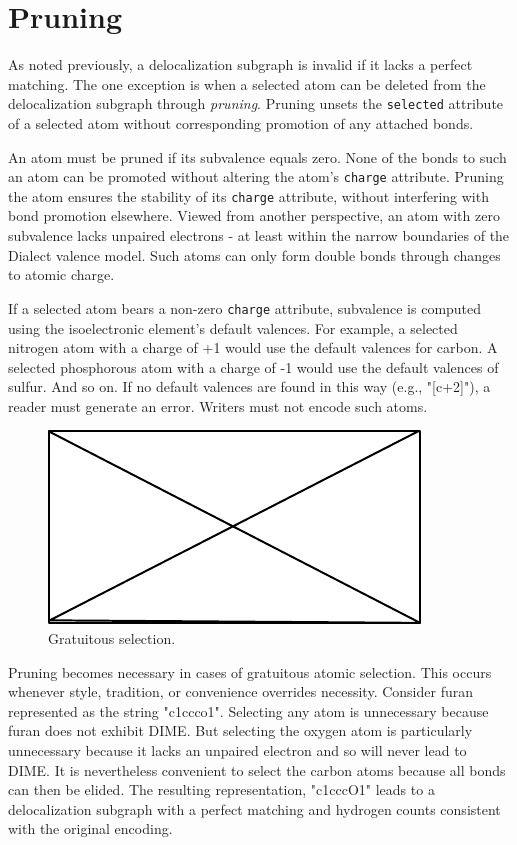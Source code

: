\documentclass{article}
\def\ttt{\texttt}
\begin{document}
\section*{Pruning}

As noted previously, a delocalization subgraph is invalid if it lacks a perfect matching. The one exception is when a selected atom can be deleted from the delocalization subgraph through \textit{pruning}. Pruning unsets the \ttt{selected} attribute of a selected atom without corresponding promotion of any attached bonds.

An atom must be pruned if its subvalence equals zero. None of the bonds to such an atom can be promoted without altering the atom's \ttt{charge} attribute. Pruning the atom ensures the stability of its \ttt{charge} attribute, without interfering with bond promotion elsewhere. Viewed from another perspective, an atom with zero subvalence lacks unpaired electrons - at least within the narrow boundaries of the Dialect valence model. Such atoms can only form double bonds through changes to atomic charge. 

If a selected atom bears a non-zero \ttt{charge} attribute, subvalence is computed using the isoelectronic element's default valences. For example, a selected nitrogen atom with a charge of +1 would use the default valences for carbon. A selected phosphorous atom with a charge of -1 would use the default valences of sulfur. And so on. If no default valences are found in this way (e.g., "[c+2]"), a reader must generate an error. Writers must not encode such atoms.

\begin{figure}
    \centering
    \includegraphics{filler}
    \caption{Gratuitous selection.}
    \label{fig:gratuitous-selection}
\end{figure}

Pruning becomes necessary in cases of gratuitous atomic selection. This occurs whenever style, tradition, or convenience overrides necessity. Consider furan represented as the string "c1ccco1". Selecting any atom is unnecessary because furan does not exhibit DIME. But selecting the oxygen atom is particularly unnecessary because it lacks an unpaired electron and so will never lead to DIME. It is nevertheless convenient to select the carbon atoms because all bonds can then be elided. The resulting representation, "c1cccO1" leads to a delocalization subgraph with a perfect matching and hydrogen counts consistent with the original encoding.
\end{document}
